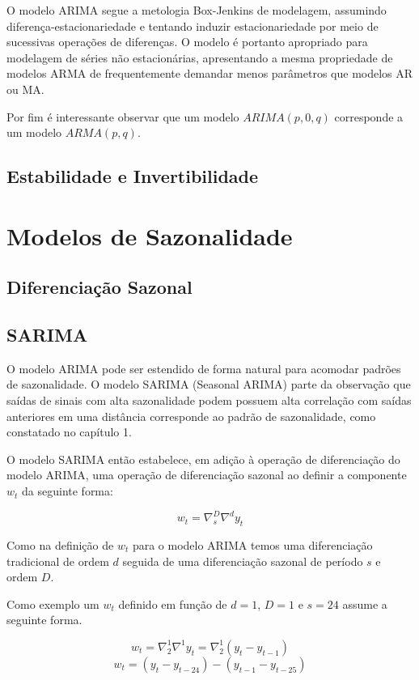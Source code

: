O modelo ARIMA segue a metologia Box-Jenkins de modelagem, assumindo
diferença-estacionariedade e tentando induzir estacionariedade por meio de
sucessivas operações de diferenças. O modelo é portanto apropriado para
modelagem de séries não estacionárias, apresentando a mesma propriedade de
modelos ARMA de frequentemente demandar menos parâmetros que modelos AR ou MA.

Por fim é interessante observar que um modelo $ARIMA(p, 0, q)$ corresponde
a um modelo $ARMA(p, q)$.

\subsection{Estabilidade e Invertibilidade}
\label{ssec:stability_invertibility}

\section{Modelos de Sazonalidade}

\subsection{Diferenciação Sazonal}

\subsection{SARIMA}\label{ssec:SARIMA}

O modelo ARIMA pode ser estendido de forma natural para acomodar padrões de
sazonalidade. O modelo SARIMA (Seasonal ARIMA) parte da observação que saídas
de sinais com alta sazonalidade podem possuem alta correlação com saídas
anteriores em uma distância corresponde ao padrão de sazonalidade, como
constatado no capítulo 1.

O modelo SARIMA então estabelece, em adição à operação de diferenciação do
modelo ARIMA, uma operação de diferenciação sazonal ao definir a componente
$w_t$ da seguinte forma:

$$ w_t = \nabla^D_{s}\nabla^d  y_t $$

Como na definição de $w_t$ para o modelo ARIMA temos uma diferenciação
tradicional de ordem $d$ seguida de uma diferenciação sazonal de período $s$
e ordem $D$.

Como exemplo um $w_t$ definido em função de $d=1$, $D=1$ e $s=24$ assume a
seguinte forma.

$$ w_t =  \nabla^1_{2} \nabla^1 y_t = \nabla^1_{2} (y_t - y_{t-1}) $$
$$ w_t =  (y_t - y_{t-24}) - (y_{t-1} - y_{t-25}) $$

